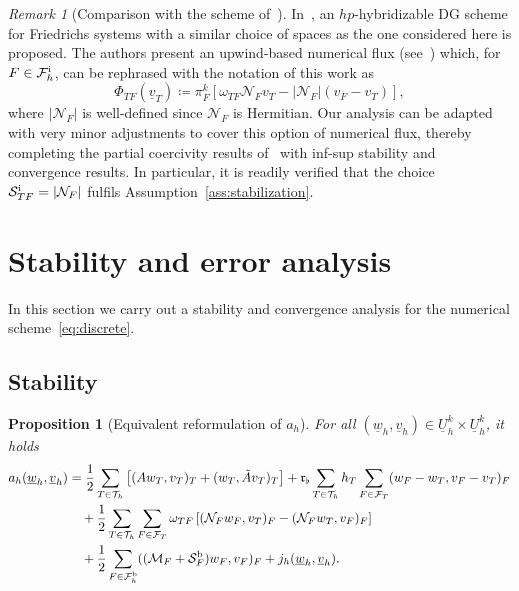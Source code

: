\documentclass[11pt,a4paper]{article}
\theoremstyle{plain}
\newtheorem{proposition}[theorem]{Proposition}
\theoremstyle{remark}
\newtheorem{remark}[theorem]{Remark}
\theoremstyle{definition}
\newcommand{\Th}{\mathcal{T}_h}
\newcommand{\Fhb}{\mathcal{F}_h^{\rm b}}
\newcommand{\Fhi}{\mathcal{F}_h^{\rm i}}
\newcommand{\FT}{\mathcal{F}_T}
\newcommand{\lproj}[2]{\pi^{#1}_{#2}}
\newcommand{\Uh}{\underline{U}_h^k}
\newcommand{\Kmin}{\mathfrak{r}_\flat}
\begin{document}
\begin{remark}[Comparison with the scheme of~\cite{Chen.Kang.ea:24}]\label{rem:Chen.Kang.ea:24:comparison}
  In~\cite{Chen.Kang.ea:24}, an $hp$-hybridizable DG scheme for Friedrichs systems with
  a similar choice of spaces as the one considered here is proposed.
  The authors present an upwind-based numerical flux (see~\cite[Eq. 3.5]{Chen.Kang.ea:24}) which, for $F\in \Fhi$, can be rephrased with the notation of this work as
  \[
  \Phi_{TF} (\underline{v}_T) \coloneqq  \lproj{k}{F} \left[ \omega_{TF} \mathcal{N}_F v_T - |\mathcal{N}_F|(v_F-v_T) \right],
  \]
  where $|\mathcal{N}_F|$ is well-defined since $\mathcal{N}_F$ is Hermitian.
  Our analysis can be adapted with very minor adjustments to cover this option of numerical flux,
  thereby completing the partial coercivity results of~\cite{Chen.Kang.ea:24} with inf-sup stability and convergence results.
  In particular, it is readily verified that the choice $\mathcal{S}_{TF}^{\rm i} = |\mathcal{N}_F|$ fulfils Assumption~\ref{ass:stabilization}.
\end{remark}


\section{Stability and error analysis}\label{sec:analysis}

In this section we carry out a stability and convergence analysis for the numerical scheme~\eqref{eq:discrete}.

\subsection{Stability}

\begin{proposition}[Equivalent reformulation of $a_h$]\label{eq:ah:reformulation.stability}
  For all $(\underline{w}_h, \underline{v}_h) \in \Uh \times \Uh$, it holds
  \begin{equation}\label{eq:ah:reformulation.stability}
    \begin{aligned}
      a_h(\underline{w}_h, \underline{v}_h)
      &=
      \frac12 \sum_{T \in \Th} \left[
        (A w_T, v_T)_T
        + (w_T, \tilde{A} v_T)_T
        \right]
      + \Kmin \sum_{T \in \Th} h_T \sum_{F \in \FT} (w_F - w_T, v_F - v_T)_F
      \\
      &\quad
      + \frac12 \sum_{T \in \Th} \sum_{F \in \FT} \omega_{TF} \left[
        (\mathcal{N}_F w_F, v_T)_F
        - (\mathcal{N}_F w_T, v_F)_F
        \right]
      \\
      &\quad
      + \frac12 \sum_{F \in \Fhb} ((\mathcal{M}_F + \mathcal{S}_F^{\rm b}) w_F, v_F)_F
      + j_h(\underline{w}_h, \underline{v}_h).
    \end{aligned}
  \end{equation}
\end{proposition}
\end{document}
